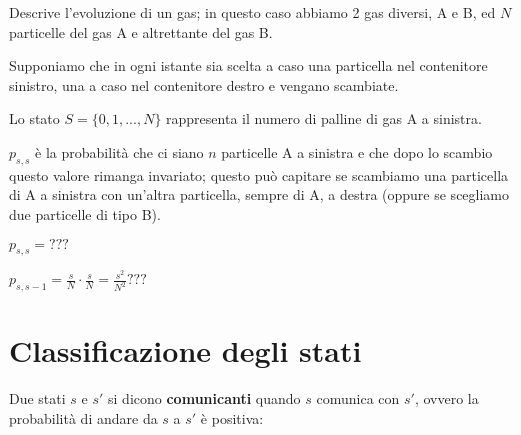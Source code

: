 \documentclass[a4paper,12pt]{book}
\begin{document}
Descrive l'evoluzione di un gas; in questo caso abbiamo 2 gas diversi, A e B, ed $ N $ particelle del gas A e altrettante del gas B.

\begin{center}
\end{center}

Supponiamo che in ogni istante sia scelta a caso una particella nel contenitore sinistro, una a caso nel contenitore destro e vengano scambiate. 

Lo stato $ S = \{0, 1, ..., N\} $ rappresenta il numero di palline di gas A a sinistra. 

$ p_{s,s} $ è la probabilità che ci siano $ n $ particelle A a sinistra e che dopo lo scambio questo valore rimanga invariato; questo può capitare se scambiamo una particella di A a sinistra con un'altra particella, sempre di A, a destra (oppure se scegliamo due particelle di tipo B).

$ p_{s,s} = ??? $ %

$ p_{s,s-1} = \frac{s}{N}\cdot \frac{s}{N} = \frac{s^2}{N^2} ???$ %

\section{Classificazione degli stati}

Due stati $ s $ e $ s' $ si dicono \textbf{comunicanti} quando $ s $ comunica con $ s' $, ovvero la probabilità di andare da $ s $ a $ s' $ è positiva:
\end{document}

